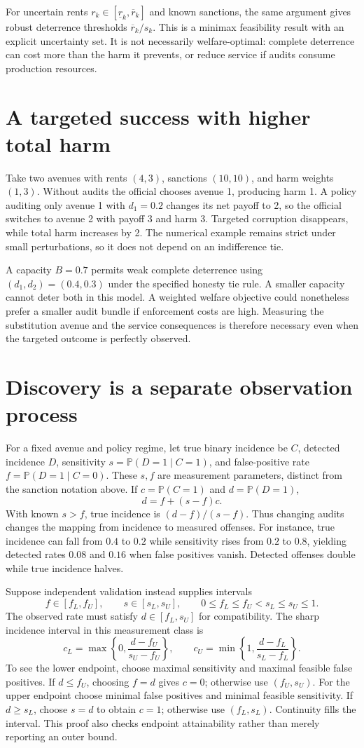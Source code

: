 \documentclass[11pt]{article}
\newcommand{\Prb}{\mathbb P}
\begin{document}
For uncertain rents $r_k\in[\underline r_k,\overline r_k]$ and known sanctions, the same argument gives robust deterrence thresholds $\overline r_k/s_k$. This is a minimax feasibility result with an explicit uncertainty set. It is not necessarily welfare-optimal: complete deterrence can cost more than the harm it prevents, or reduce service if audits consume production resources.

\section*{A targeted success with higher total harm}
Take two avenues with rents $(4,3)$, sanctions $(10,10)$, and harm weights $(1,3)$. Without audits the official chooses avenue 1, producing harm 1. A policy auditing only avenue 1 with $d_1=0.2$ changes its net payoff to 2, so the official switches to avenue 2 with payoff 3 and harm 3. Targeted corruption disappears, while total harm increases by 2. The numerical example remains strict under small perturbations, so it does not depend on an indifference tie.

A capacity $B=0.7$ permits weak complete deterrence using $(d_1,d_2)=(0.4,0.3)$ under the specified honesty tie rule. A smaller capacity cannot deter both in this model. A weighted welfare objective could nonetheless prefer a smaller audit bundle if enforcement costs are high. Measuring the substitution avenue and the service consequences is therefore necessary even when the targeted outcome is perfectly observed.

\section*{Discovery is a separate observation process}
For a fixed avenue and policy regime, let true binary incidence be $C$, detected incidence $D$, sensitivity $s=\Prb(D=1\mid C=1)$, and false-positive rate $f=\Prb(D=1\mid C=0)$. These $s,f$ are measurement parameters, distinct from the sanction notation above. If $c=\Prb(C=1)$ and $d=\Prb(D=1)$,
\[
 d=f+(s-f)c.
\]
With known $s>f$, true incidence is $(d-f)/(s-f)$. Thus changing audits changes the mapping from incidence to measured offenses. For instance, true incidence can fall from $0.4$ to $0.2$ while sensitivity rises from $0.2$ to $0.8$, yielding detected rates $0.08$ and $0.16$ when false positives vanish. Detected offenses double while true incidence halves.

Suppose independent validation instead supplies intervals
\[
 f\in[f_L,f_U],\qquad s\in[s_L,s_U],\qquad
 0\leq f_L\leq f_U<s_L\leq s_U\leq1.
\]
The observed rate must satisfy $d\in[f_L,s_U]$ for compatibility. The sharp incidence interval in this measurement class is
\[
 c_L=\max\left\{0,\frac{d-f_U}{s_U-f_U}\right\},\qquad
 c_U=\min\left\{1,\frac{d-f_L}{s_L-f_L}\right\}.
\]
To see the lower endpoint, choose maximal sensitivity and maximal feasible false positives. If $d\leq f_U$, choosing $f=d$ gives $c=0$; otherwise use $(f_U,s_U)$. For the upper endpoint choose minimal false positives and minimal feasible sensitivity. If $d\geq s_L$, choose $s=d$ to obtain $c=1$; otherwise use $(f_L,s_L)$. Continuity fills the interval. This proof also checks endpoint attainability rather than merely reporting an outer bound.
\end{document}
